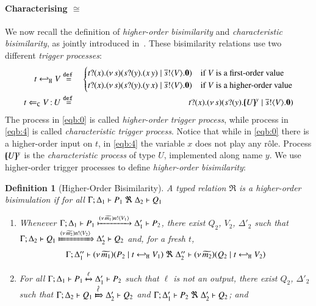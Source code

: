 \documentclass[preprint,11pt]{elsarticle}
\newtheorem{definition}{Definition}[section]
\begin{document}
{\paragraph{Characterising $\cong$}
We now recall the definition of \emph{higher-order bisimilarity} and 
\emph{characteristic bisimilarity}, as jointly introduced in~\cite{KouzapasPY17}.
These bisimilarity relations
use two different \emph{trigger processes}:
%
\begin{eqnarray}
	t \hookleftarrow_{\mathtt{H}} V	& \stackrel{\mathtt{def}\ }{=} &
	\begin{cases}
		t ? (x) . (\nu\, s)(s ? (y) . (x\, {y}) \;|\; \overline{s} ! \langle V \rangle . \mathbf{0}) & {\text{if $V$ is a first-order value}}\\
		t ? (x) . (\nu\, s)(s ? (y) . (y\, {x}) \;|\; \overline{s} ! \langle V \rangle . \mathbf{0}) & \text{if $V$ is a higher-order value}
		\end{cases}
	\label{eqb:0} \\
	t \Leftarrow_{\mathtt{C}} V{\,:\,}U	& \stackrel{\mathtt{def}\ }{=} &	t ? (x) . (\nu\, s)(s ? (y) . [\!\!(U)\!\!]^{y} \;|\; \overline{s} ! \langle V \rangle . \mathbf{0})	
	\label{eqb:4}
\end{eqnarray}
%
The process in \eqref{eqb:0} is called \emph{higher-order trigger process},
while process in \eqref{eqb:4} is called \emph{characteristic trigger process}.
Notice that while 
in \eqref{eqb:0} there is a higher-order input on $t$, 
in \eqref{eqb:4} the variable $x$ does not play any r\^{o}le.
Process $[\!\!(U)\!\!]^{y}$ is the \emph{characteristic process} of type $U$, implemented along name $y$.
We use higher-order trigger processes to define \emph{higher-order bisimilarity}:

\begin{definition}[Higher-Order Bisimilarity]
	\label{d:hbw}
	A typed relation $\Re$ is a {\em  higher-order bisimulation} if 
	for all $\horel{\Gamma}{\Delta_1}{P_1}{\ \Re \ }{\Delta_2}{Q_1}$ 
%
	\begin{enumerate}[1)]
		\item 
				Whenever 
				$\Gamma; \Delta_1 \vdash P_1 \xmapsto{(\nu\, \widetilde{m_1}) n !\langle V_1 \rangle} \Delta_1' \vdash P_2$, there exist 
				$Q_2$, $V_2$, $\Delta'_2$ such that 
				$\horel{\Gamma}{\Delta_2}{Q_1}{\Hby{\news{\widetilde{m_2}} \bactout{n}{V_2}}}{\Delta_2'}{Q_2}$ and, for a fresh $t$, 
				\[
					\begin{array}{lrlll}
						\Gamma; \Delta''_1  \proves  {\newsp{\widetilde{m_1}}{P_2 \Par \htrigger{t}{V_1}}}
						\ \Re\ 
						\Delta''_2 \proves {\newsp{\widetilde{m_2}}{Q_2 \Par \htrigger{t}{V_2}}}
					\end{array}
				\]
		\item	
				For all $\Gamma; \Delta_1 \vdash P_1 \xmapsto{\ell} \Delta_1' \vdash P_2$ such that 
				$\ell$ is not an output, 
				there exist $Q_2$, $\Delta'_2$ such that 
				$\horel{\Gamma}{\Delta_2}{Q_1}{\Hby{\hat{\ell}}}{\Delta_2'}{Q_2}$
				and
				$\horel{\Gamma}{\Delta_1'}{P_2}{\ \Re \ }{\Delta_2'}{Q_2}$; and 


\end{enumerate}
\end{definition}}
\end{document}
